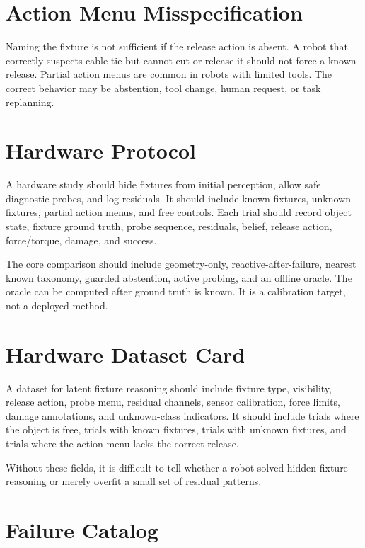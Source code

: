 \documentclass{article}
\begin{document}
\section{Action Menu Misspecification}

Naming the fixture is not sufficient if the release action is absent. A robot
that correctly suspects cable tie but cannot cut or release it should not
force a known release. Partial action menus are common in robots with limited
tools. The correct behavior may be abstention, tool change, human request, or
task replanning.

\section{Hardware Protocol}

A hardware study should hide fixtures from initial perception, allow safe
diagnostic probes, and log residuals. It should include known fixtures,
unknown fixtures, partial action menus, and free controls. Each trial should
record object state, fixture ground truth, probe sequence, residuals, belief,
release action, force/torque, damage, and success.

The core comparison should include geometry-only, reactive-after-failure,
nearest known taxonomy, guarded abstention, active probing, and an offline
oracle. The oracle can be computed after ground truth is known. It is a
calibration target, not a deployed method.

\section{Hardware Dataset Card}

A dataset for latent fixture reasoning should include fixture type, visibility,
release action, probe menu, residual channels, sensor calibration, force
limits, damage annotations, and unknown-class indicators. It should include
trials where the object is free, trials with known fixtures, trials with
unknown fixtures, and trials where the action menu lacks the correct release.

Without these fields, it is difficult to tell whether a robot solved hidden
fixture reasoning or merely overfit a small set of residual patterns.

\section{Failure Catalog}
\end{document}
